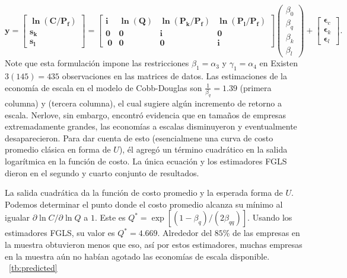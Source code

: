 \[ \bm{y}=
\begin{bmatrix}
\bm{\ln(C/P_{f})} \\
\bm{s_{k}} \\
\bm{s_{l}}
\end{bmatrix} = \begin{bmatrix}
\bm{i} & \bm{\ln(Q)} & \bm{\ln(P_{k} / P_{f})} & \bm{\ln(P_{l} / P_{f})}\\
\bm{0} & \bm{0} & \bm{i} & \bm{0} \\\
\bm{0} & \bm{0} & \bm{0} & \bm{i}
\end{bmatrix}\begin{pmatrix}
\beta_{0}\\
\beta_{q}\\
\beta_{k}\\
\beta_{l}
\end{pmatrix} + \begin{bmatrix}
\bm{\epsilon}_{c}\\
\bm{\epsilon}_{k}\\
\bm{\epsilon}_{l}
\end{bmatrix}.
\]
Note que esta formulación impone las restricciones $\beta_{1}=\alpha_{3}$ y $\gamma_{1}=\alpha_{4}$ en %
Existen $3\left(145\right)=435$ observaciones en las matrices de datos. %
Las estimaciones de la economía de escala en el modelo de Cobb-Douglas son $\frac{1}{\beta_{q}}=1.39$ (primera columna) y (tercera columna), el cual sugiere algún incremento de retorno a escala. Nerlove, sin embargo, encontró evidencia que en tamaños de empresas extremadamente grandes, las economías a escalas disminuyeron y eventualmente desaparecieron. Para dar cuenta de esto (esencialmene una curva de costo promedio clásica en forma de $U$), él agregó un término cuadrático en la salida logarítmica en la función de costo. La única ecuación y los estimadores FGLS dieron en el segundo y cuarto conjunto de resultados.

La salida cuadrática da la función de costo promedio y la esperada forma de $U$. Podemos determinar el punto donde el costo promedio alcanza su mínimo al igualar $\partial\ln C/\partial\ln Q$ a $1$. Este es $Q^{\ast}=\exp\left[\left(1-\beta_{q}\right)/\left(2\beta_{qq}\right)\right]$. Usando los estimadores FGLS, su valor es $Q^{\ast}=4.669$. Alrededor del $85$\% de las empresas en la muestra obtuvieron menos que eso, así por estos estimadores, muchas empresas en la muestra aún no habían agotado las economías de escala disponible.
~\ref{tb:predicted}

